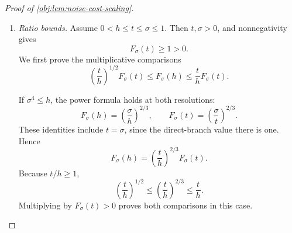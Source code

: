 \begin{proof}[Proof of \cref{obj:lem:noise-cost-scaling}]
\begin{enumerate}
If \(h<\sigma^4\le t\), compare through the interface:
\[
\begin{aligned}
\Psi(t,\sigma)
&=\left(\frac{\sigma}{t}\right)^{2/3}-1\\
&\le\left(\frac{\sigma}{\sigma^4}\right)^{2/3}-1\\
&=(\sigma^4)^{-1/2}
 \left[1+\log\left(\frac{\sigma^2}{\sqrt{\sigma^4}}\right)\right]-1\\
&\le h^{-1/2}
 \left[1+\log\left(\frac{\sigma^2}{\sqrt h}\right)\right]-1
=\Psi(h,\sigma).
\end{aligned}
\]
The first inequality is the power comparison just established, and the equality is the interface identity. For the last inequality,
\[
(\sigma^4)^{-1/2}\le h^{-1/2},
\qquad
0=\log\left(\frac{\sigma^2}{\sqrt{\sigma^4}}\right)
\le\log\left(\frac{\sigma^2}{\sqrt h}\right);
\]
multiplying the corresponding nonnegative factors gives the required bound.

Finally, if \(h\le t<\sigma^4\), then
\[
\sqrt t\le\sigma^2,\qquad
0\le\log\left(\frac{\sigma^2}{\sqrt t}\right)
\le\log\left(\frac{\sigma^2}{\sqrt h}\right),
\qquad
t^{-1/2}\le h^{-1/2}.
\]
Here the logarithmic comparison follows from \(\sqrt h\le\sqrt t\) and monotonicity of the logarithm on positive arguments. Multiplication yields
\[
t^{-1/2}\left[1+\log\left(\frac{\sigma^2}{\sqrt t}\right)\right]-1
\le
h^{-1/2}\left[1+\log\left(\frac{\sigma^2}{\sqrt h}\right)\right]-1.
\]
These cases establish that the cost is nonincreasing.

\item \emph{Ratio bounds.}
Assume \(0<h\le t\le\sigma\le1\). Then \(t,\sigma>0\), and nonnegativity gives
\[
F_\sigma(t)\ge1>0.
\]
We first prove the multiplicative comparisons
\[
\left(\frac th\right)^{1/2}F_\sigma(t)
\le F_\sigma(h)
\le\frac th F_\sigma(t).
\]

If \(\sigma^4\le h\), the power formula holds at both resolutions:
\[
F_\sigma(h)=\left(\frac{\sigma}{h}\right)^{2/3},
\qquad
F_\sigma(t)=\left(\frac{\sigma}{t}\right)^{2/3}.
\]
These identities include \(t=\sigma\), since the direct-branch value there is one. Hence
\[
F_\sigma(h)=\left(\frac th\right)^{2/3}F_\sigma(t).
\]
Because \(t/h\ge1\),
\[
\left(\frac th\right)^{1/2}
\le\left(\frac th\right)^{2/3}
\le\frac th.
\]
Multiplying by \(F_\sigma(t)>0\) proves both comparisons in this case.


\end{enumerate}
\end{proof}
